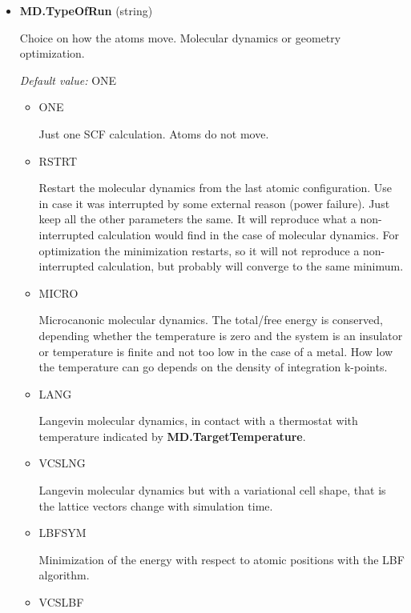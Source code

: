 \documentclass[11pt]{article}
\begin{document}
\begin{itemize}

\item{\bf MD.TypeOfRun} (string)

   Choice on how the atoms move.  Molecular dynamics or geometry optimization.

  \textit{Default value:}  ONE

   \begin{itemize}

      \item{ONE}

      Just one SCF calculation.  Atoms do not move.

      \item{RSTRT}

      Restart the molecular dynamics from the last atomic configuration.
      Use in case it was interrupted by some external reason (power failure).
      Just keep all the other parameters the same.
      It will reproduce what a non-interrupted calculation would find
      in the case of molecular dynamics.  For optimization the minimization restarts,
      so it will not reproduce a non-interrupted calculation, but probably will converge
      to the same minimum.

      \item{MICRO}

      Microcanonic molecular dynamics.  The total/free energy is conserved, depending
      whether the temperature is zero and the system is an insulator or temperature is finite
      and not too low in the case of a metal.  How low the temperature can go depends on the
      density of integration k-points.

      \item{LANG}

      Langevin molecular dynamics, in contact with a thermostat with temperature
      indicated by {\bf MD.TargetTemperature}.

      \item{VCSLNG}

      Langevin molecular dynamics but with a variational cell shape, that is the lattice vectors
      change with simulation time.

      \item{LBFSYM}

      Minimization of the energy with respect to atomic positions with the LBF algorithm.

      \item{VCSLBF}


\end{itemize}
\end{itemize}
\end{document}
